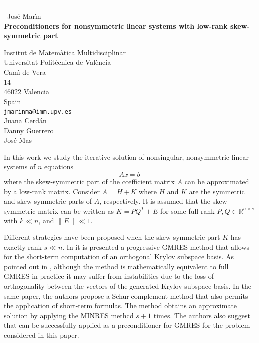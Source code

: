 \documentclass{report}
\begin{document}
\begin{center}
\rule{6in}{1pt} \
{\large Jos\'e Mar{\'{\i}}n \\
{\bf Preconditioners for nonsymmetric linear systems with low-rank skew-symmetric part}}

Institut de Matem\`atica Multidisciplinar \\ Universitat Polit\`ecnica de Val\`encia \\ Cam{\'{\i}} de Vera \\ 14 \\ 46022 Valencia \\ Spain
\\
{\tt jmarinma@imm.upv.es}\\
Juana Cerd\'an\\
Danny Guerrero\\
Jos\'e Mas\end{center}

\newcommand{\reals}{\mathbb{R}}

In this work we study the iterative solution of nonsingular, nonsymmetric
linear systems of $n$ equations
\begin{equation} Ax=b \end{equation}
where the skew-symmetric part of the coefficient matrix $A$ can be
approximated by a low-rank matrix.
Consider $A=H+K$ where $H$ and $K$ are the symmetric and skew-symmetric
parts of $A$, respectively. It is assumed that the skew-symmetric matrix
can be written as $K=PQ^T + E$ for some full rank $P,Q \in \reals^{n
\times s}$ with $k \ll n$, and $\| E \| \ll 1$.

Different strategies have been proposed when the skew-symmetric part $K$
has exactly rank $s \ll n$. In \cite{Beckermann:2008} it is presented a
progressive GMRES method that allows for the short-term computation of an
orthogonal Krylov subspace basis. As pointed out in \cite{ESSSX.2012},
although the method is mathematically equivalent to full GMRES
\cite{sasc:86} in practice it may suffer from instabilities due to the
loss of orthogonality between the vectors of the generated Krylov
subspace basis. In the same paper, the authors propose a Schur complement
method that also permits the application of short-term formulas. The
method obtains an
approximate solution by applying the MINRES method $s+1$ times. The
authors also suggest that can be successfully applied as a preconditioner
for GMRES for the problem considered in this paper.
\end{document}
